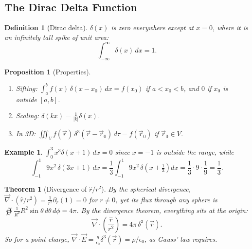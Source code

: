 \documentclass{article}
\newtheorem{theorem}{Theorem}
\newtheorem{definition}{Definition}
\newtheorem*{example}{Example}
\newtheorem{proposition}{Proposition}
\begin{document}
\subsection{The Dirac Delta Function}
\begin{definition}[Dirac delta]
    $\delta(x)$ is zero everywhere except at $x = 0$, where it is an infinitely tall spike of unit area:
    \[\int_{-\infty}^{\infty}\delta(x)\,dx = 1.\]
\end{definition}
\begin{proposition}[Properties]
    \begin{enumerate}[label=(\roman*)]
        \item Sifting: $\int_a^b f(x)\,\delta(x - x_0)\,dx = f(x_0)$ if $a < x_0 < b$, and $0$ if $x_0$ is outside $[a,b]$.
        \item Scaling: $\delta(kx) = \frac{1}{|k|}\delta(x)$.
        \item In 3D: $\iiint_V f(\vec{r})\,\delta^3(\vec{r} - \vec{r}_0)\,d\tau = f(\vec{r}_0)$ if $\vec{r}_0 \in V$.
    \end{enumerate}
\end{proposition}
\begin{example}
    $\int_0^3 x^3\delta(x+1)\,dx = 0$ since $x = -1$ is outside the range, while
    \[\int_{-1}^{1}9x^2\,\delta(3x+1)\,dx = \frac{1}{3}\int_{-1}^{1}9x^2\,\delta\!\left(x+\tfrac{1}{3}\right)dx = \frac{1}{3}\cdot 9\cdot\frac{1}{9} = \frac{1}{3}.\]
\end{example}
\begin{theorem}[Divergence of $\hat{r}/r^2$]
    \label{div-r2}
    By the spherical divergence, $\vec{\nabla}\cdot\left(\hat{r}/r^2\right) = \frac{1}{r^2}\partial_r(1) = 0$ for $r \neq 0$, yet its flux through any sphere is $\oiint\frac{1}{R^2}R^2\sin\theta\,d\theta\,d\phi = 4\pi$. By the divergence theorem, everything sits at the origin:
    \[\vec{\nabla}\cdot\left(\frac{\hat{r}}{r^2}\right) = 4\pi\,\delta^3(\vec{r}).\]
    So for a point charge, $\vec{\nabla}\cdot\vec{E} = \frac{q}{\epsilon_0}\delta^3(\vec{r}) = \rho/\epsilon_0$, as Gauss' law requires.
\end{theorem}
\end{document}
